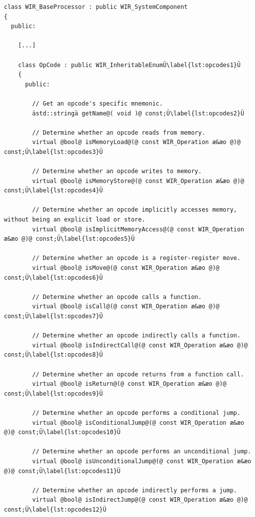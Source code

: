 \begin{lstlisting}[style=code,float=!ht,caption={Generic Opcode Handling of Class \texttt{WIR\_BaseProcessor}},label=lst:opcodes]
class WIR_BaseProcessor : public WIR_SystemComponent
{
  public:

    [...]

    class OpCode : public WIR_InheritableEnumÜ\label{lst:opcodes1}Ü
    {
      public:

        // Get an opcode's specific mnemonic.
        ästd::stringä getName@( void )@ const;Ü\label{lst:opcodes2}Ü

        // Determine whether an opcode reads from memory.
        virtual @bool@ isMemoryLoad@(@ const WIR_Operation æ&æo @)@ const;Ü\label{lst:opcodes3}Ü

        // Determine whether an opcode writes to memory.
        virtual @bool@ isMemoryStore@(@ const WIR_Operation æ&æo @)@ const;Ü\label{lst:opcodes4}Ü

        // Determine whether an opcode implicitly accesses memory, without being an explicit load or store.
        virtual @bool@ isImplicitMemoryAccess@(@ const WIR_Operation æ&æo @)@ const;Ü\label{lst:opcodes5}Ü

        // Determine whether an opcode is a register-register move.
        virtual @bool@ isMove@(@ const WIR_Operation æ&æo @)@ const;Ü\label{lst:opcodes6}Ü

        // Determine whether an opcode calls a function.
        virtual @bool@ isCall@(@ const WIR_Operation æ&æo @)@ const;Ü\label{lst:opcodes7}Ü

        // Determine whether an opcode indirectly calls a function.
        virtual @bool@ isIndirectCall@(@ const WIR_Operation æ&æo @)@ const;Ü\label{lst:opcodes8}Ü

        // Determine whether an opcode returns from a function call.
        virtual @bool@ isReturn@(@ const WIR_Operation æ&æo @)@ const;Ü\label{lst:opcodes9}Ü

        // Determine whether an opcode performs a conditional jump.
        virtual @bool@ isConditionalJump@(@ const WIR_Operation æ&æo @)@ const;Ü\label{lst:opcodes10}Ü

        // Determine whether an opcode performs an unconditional jump.
        virtual @bool@ isUnconditionalJump@(@ const WIR_Operation æ&æo @)@ const;Ü\label{lst:opcodes11}Ü

        // Determine whether an opcode indirectly performs a jump.
        virtual @bool@ isIndirectJump@(@ const WIR_Operation æ&æo @)@ const;Ü\label{lst:opcodes12}Ü


\end{lstlisting}

